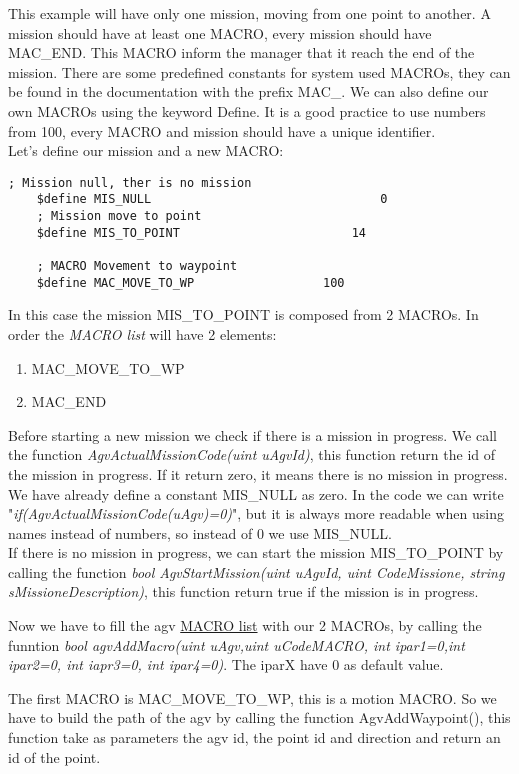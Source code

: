 This example will have only one mission, moving from one point to another. A mission should have at least one MACRO, every mission should have MAC\_END. This MACRO inform the manager that it reach the end of the mission.
There are some predefined constants for system used MACROs, they can be found in the documentation with the prefix MAC\_.
We can also define our own MACROs using the keyword Define. It is a good practice to use numbers from 100, every MACRO and mission should have a unique identifier.\\

Let's define our mission and a new MACRO:
\begin{lstlisting}[frame=single]
	; Mission null, ther is no mission
	$define MIS_NULL								0
	; Mission move to point
	$define MIS_TO_POINT						14
	
	; MACRO Movement to waypoint
	$define MAC_MOVE_TO_WP					100
\end{lstlisting}

In this case the mission MIS\_TO\_POINT is composed from 2 MACROs. In order the \textit{MACRO list} will have 2 elements:
\begin{enumerate}
	\item MAC\_MOVE\_TO\_WP
	\item MAC\_END \\
\end{enumerate}

Before starting a new mission we check if there is a mission in progress.
We call the function \textit{AgvActualMissionCode(uint uAgvId)}, this function return the id of the mission in progress.
If it return zero, it means there is no mission in progress. We have already define a constant MIS\_NULL as zero.
In the code we can write "\textit{if(AgvActualMissionCode(uAgv)=0)}", but it is always more readable when using names instead of numbers, so instead of 0 we use MIS\_NULL.\\

If there is no mission in progress, we can start the mission MIS\_TO\_POINT by calling the function \textit{bool AgvStartMission(uint uAgvId, uint CodeMissione, string sMissioneDescription)}, this function return true if the mission is in progress.

Now we have to fill the agv \underline{MACRO list} with our 2 MACROs, by calling the funntion \textit{bool agvAddMacro(uint uAgv,uint uCodeMACRO, int ipar1=0,int ipar2=0, int iapr3=0, int ipar4=0)}. The iparX have 0 as default value.

The first MACRO is MAC\_MOVE\_TO\_WP, this is a motion MACRO. So we have to build the path of the agv by calling the function AgvAddWaypoint(), this function take as parameters the agv id, the point id and direction and return an id of the point.

